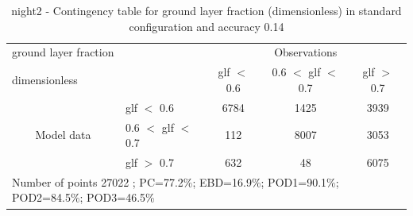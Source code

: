 \begin{table}[p!]
\begin{center}
\begin{tabular}{llccc}
\hline
{ground layer fraction}                                       &                                                    & \multicolumn{3}{c}{Observations}                 \\
{dimensionless}                                       &                             & glf $<$ 0.6   & 0.6 $<$ glf $<$ 0.7 & glf $>$ 0.7 \\
\hline
\multicolumn{1}{c}{\multirow{3}{*}{Model data}}  & glf $<$ 0.6             & 6784                & 1425                       & 3939              \\
                                                 & 0.6  $<$ glf $<$ 0.7 & 112                & 8007                       & 3053              \\
                                                 & glf $>$ 0.7             & 632                & 48                       & 6075              \\
\hline
\multicolumn{5}{l}{ Number of points        27022 ; PC=77.2\%; EBD=16.9\%; POD1=90.1\%; POD2=84.5\%; POD3=46.5\%}
\end{tabular}
\end{center}
\caption{night2 - Contingency table for  ground layer fraction (dimensionless) in standard configuration and accuracy 0.14}
\label{tab:contingencyglfBEF:night2}
\end{table}
